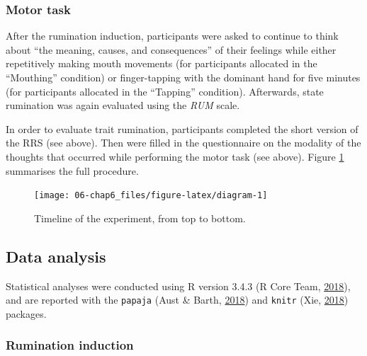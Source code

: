 \documentclass[a4paper,12pt,twoside,openright,oldfontcommands]{memoir}
\begin{document}
\hypertarget{proc_supp}{%
\subsubsection{Motor task}\label{proc_supp}}

After the rumination induction, participants were asked to continue to think about \enquote{the meaning, causes, and consequences} of their feelings while either repetitively making mouth movements (for participants allocated in the \enquote{Mouthing} condition) or finger-tapping with the dominant hand for five minutes (for participants allocated in the \enquote{Tapping} condition). Afterwards, state rumination was again evaluated using the \emph{RUM} scale.

In order to evaluate trait rumination, participants completed the short version of the RRS (see above). Then were filled in the questionnaire on the modality of the thoughts that occurred while performing the motor task (see above). Figure \ref{fig:diagram} summarises the full procedure.

\begin{figure}[H]

{\centering \texttt{[image: 06-chap6\_files/figure-latex/diagram-1]} 

}

\caption{Timeline of the experiment, from top to bottom.}\label{fig:diagram}
\end{figure}

\hypertarget{data-analysis-2}{%
\subsection{Data analysis}\label{data-analysis-2}}

Statistical analyses were conducted using R version 3.4.3 (R Core Team, \protect\hyperlink{ref-R-base}{2018}), and are reported with the \texttt{papaja} (Aust \& Barth, \protect\hyperlink{ref-R-papaja}{2018}) and \texttt{knitr} (Xie, \protect\hyperlink{ref-R-knitr}{2018}) packages.

\hypertarget{rumination-induction-2}{%
\subsubsection{Rumination induction}\label{rumination-induction-2}}
\end{document}
